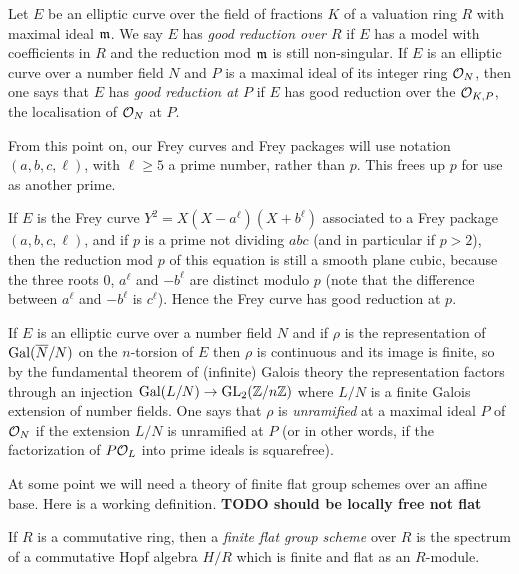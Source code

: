 \begin{definition}\label{good_reduction} Let $E$ be an elliptic curve over the field of fractions $K$ of a valuation ring $R$ with maximal ideal $\mathfrak{m}$. We say $E$ has \emph{good reduction over $R$} if $E$ has a model with 
coefficients in $R$ and the reduction mod $\mathfrak{m}$ is still non-singular. If $E$ is an elliptic curve 
over a number field $N$ and $P$ is a maximal ideal of its integer ring $\mathcal{O}_N$, then one says that $E$ has \emph{good reduction at $P$} if $E$ has good reduction over the $\mathcal{O}_{K,P}$, the localisation of $\mathcal{O}_N$ at $P$.
\end{definition}

\begin{remark} From this point on, our Frey curves and Frey packages will use notation $(a,b,c,\ell)$, with $\ell\geq 5$ a prime number, rather than $p$. This frees up $p$ for use as another prime.
\end{remark}

\begin{example} If $E$ is the Frey curve $Y^2=X(X-a^\ell)(X+b^\ell)$ associated to a
  Frey package $(a,b,c,\ell)$, and if $p$ is a prime
  not dividing $abc$ (and in particular if $p>2$), then the reduction mod $p$ of this 
  equation is still a smooth
  plane cubic, because the three roots $0$, $a^\ell$ and $-b^\ell$ are distinct modulo $p$
  (note that the difference between $a^\ell$ and $-b^\ell$ is $c^\ell$). Hence the Frey curve
  has good reduction at $p$.
\end{example}

If $E$ is an elliptic curve over a number field $N$ and if $\rho$ is the representation
of $\operatorname{Gal}(\overline{N}/N)$ on the $n$-torsion of $E$ then $\rho$ is continuous and its image is finite,
so by the fundamental theorem of (infinite) Galois theory the representation factors through an
injection $\operatorname{Gal}(L/N)\to\operatorname{GL}_2(\mathbb{Z}/n\mathbb{Z})$ where $L/N$ is a finite Galois extension of
number fields. One says that $\rho$ is \emph{unramified} at a maximal ideal $P$ of $\mathcal{O}_N$
if the extension $L/N$ is unramified at $P$ (or in other words, if the factorization
of $P\mathcal{O}_L$ into prime ideals is squarefree).

At some point we will need a theory of finite flat group schemes over an affine base. Here
is a working definition. {\bf TODO should be locally free not flat}

\begin{definition}\label{finite_flat_group_scheme} If $R$ is a commutative ring, then
  a \emph{finite flat group scheme} over $R$ is the spectrum of a commutative Hopf algebra $H/R$ 
  which is finite and flat as an $R$-module.
\end{definition}


